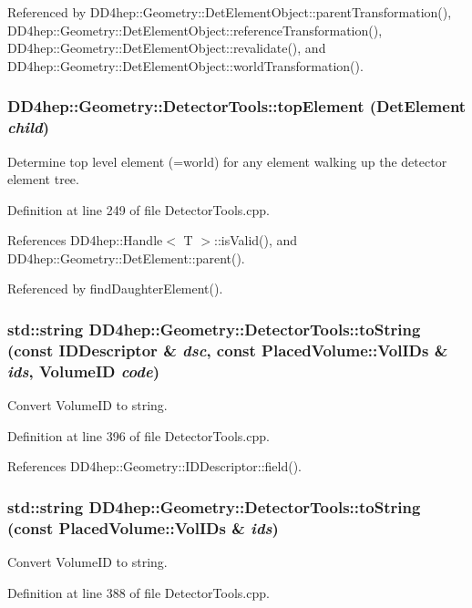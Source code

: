 Referenced by DD4hep::Geometry::DetElementObject::parentTransformation(), DD4hep::Geometry::DetElementObject::referenceTransformation(), DD4hep::Geometry::DetElementObject::revalidate(), and DD4hep::Geometry::DetElementObject::worldTransformation().\hypertarget{namespace_d_d4hep_1_1_geometry_1_1_detector_tools_aa2a3cf3ac7fbdabef840f02eb0d60d91}{
\subsubsection[{topElement}]{ DD4hep::Geometry::DetectorTools::topElement ({\bf DetElement} {\em child})}}
\label{namespace_d_d4hep_1_1_geometry_1_1_detector_tools_aa2a3cf3ac7fbdabef840f02eb0d60d91}


Determine top level element (=world) for any element walking up the detector element tree. 

Definition at line 249 of file DetectorTools.cpp.

References DD4hep::Handle$<$ T $>$::isValid(), and DD4hep::Geometry::DetElement::parent().

Referenced by findDaughterElement().\hypertarget{namespace_d_d4hep_1_1_geometry_1_1_detector_tools_ae5de1f83490fd1476f7663078ffc08c7}{
\subsubsection[{toString}]{\setlength{\rightskip}{0pt plus 5cm}std::string DD4hep::Geometry::DetectorTools::toString (const {\bf IDDescriptor} \& {\em dsc}, \/  const {\bf PlacedVolume::VolIDs} \& {\em ids}, \/  VolumeID {\em code})}}
\label{namespace_d_d4hep_1_1_geometry_1_1_detector_tools_ae5de1f83490fd1476f7663078ffc08c7}


Convert VolumeID to string. 

Definition at line 396 of file DetectorTools.cpp.

References DD4hep::Geometry::IDDescriptor::field().\hypertarget{namespace_d_d4hep_1_1_geometry_1_1_detector_tools_accc8aeaf883652cfb64beae7479b9f11}{
\subsubsection[{toString}]{\setlength{\rightskip}{0pt plus 5cm}std::string DD4hep::Geometry::DetectorTools::toString (const {\bf PlacedVolume::VolIDs} \& {\em ids})}}
\label{namespace_d_d4hep_1_1_geometry_1_1_detector_tools_accc8aeaf883652cfb64beae7479b9f11}


Convert VolumeID to string. 

Definition at line 388 of file DetectorTools.cpp.
